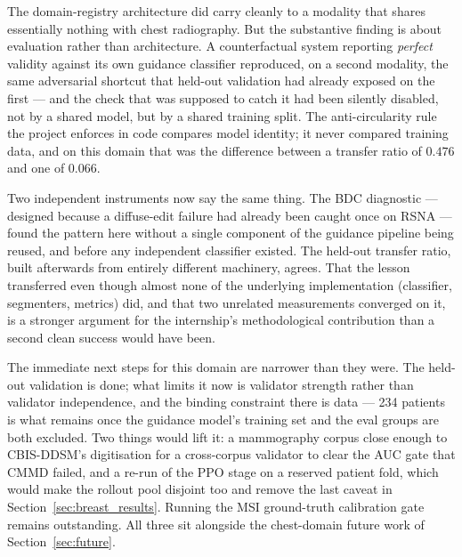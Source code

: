 The domain-registry architecture did carry cleanly to a modality that shares
essentially nothing with chest radiography. But the substantive finding is
about evaluation rather than architecture. A counterfactual system reporting
\emph{perfect} validity against its own guidance classifier reproduced, on a
second modality, the same adversarial shortcut that held-out validation had
already exposed on the first --- and the check that was supposed to catch it
had been silently disabled, not by a shared model, but by a shared training
split. The anti-circularity rule the project enforces in code compares model
identity; it never compared training data, and on this domain that was the
difference between a transfer ratio of $0.476$ and one of $0.066$.

Two independent instruments now say the same thing. The BDC diagnostic ---
designed because a diffuse-edit failure had already been caught once on RSNA
--- found the pattern here without a single component of the guidance
pipeline being reused, and before any independent classifier existed. The
held-out transfer ratio, built afterwards from entirely different machinery,
agrees. That the lesson transferred even though almost none of the underlying
implementation (classifier, segmenters, metrics) did, and that two unrelated
measurements converged on it, is a stronger argument for the internship's
methodological contribution than a second clean success would have been.

The immediate next steps for this domain are narrower than they were. The
held-out validation is done; what limits it now is validator strength rather
than validator independence, and the binding constraint there is data --- 234
patients is what remains once the guidance model's training set and the eval
groups are both excluded. Two things would lift it: a mammography corpus
close enough to CBIS-DDSM's digitisation for a cross-corpus validator to
clear the AUC gate that CMMD failed, and a re-run of the PPO stage on a
reserved patient fold, which would make the rollout pool disjoint too and
remove the last caveat in Section~\ref{sec:breast_results}. Running the MSI
ground-truth calibration gate remains outstanding. All three sit alongside
the chest-domain future work of Section~\ref{sec:future}.
